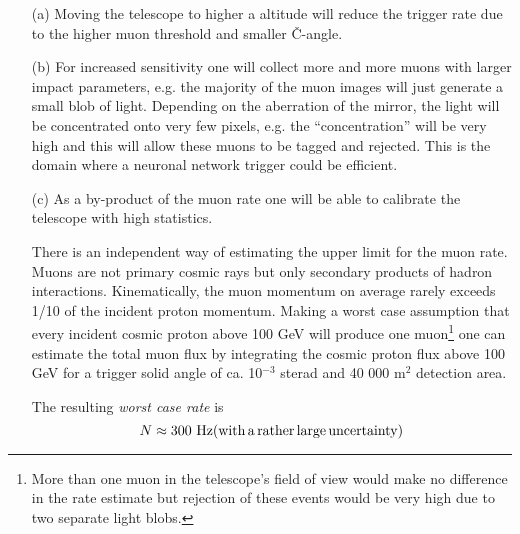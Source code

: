 \begin{itemize}
\item[(a)]  Moving the telescope to higher a altitude will
reduce the trigger rate due to the higher muon threshold and smaller \v{C}-angle.

\item[(b)]  For increased sensitivity one will collect more and more muons
with larger impact parameters, e.g. the majority of the muon images will
just generate a small blob of light. Depending on the aberration of the
mirror, the light will be concentrated onto very few pixels, e.g. the
``concentration'' will be very high and this will allow these muons to be
tagged and rejected. This is the domain where a neuronal network 
trigger could be
efficient.

\item[(c)]  As a by-product of the muon rate one will be able to
calibrate the telescope with high statistics.

There is an independent way of estimating the upper limit for 
the muon rate. Muons are
not primary cosmic rays but only secondary products of hadron interactions.
Kinematically, the muon momentum on average rarely exceeds 1/10 of the
incident proton momentum. Making a worst case assumption that every incident
cosmic proton above 100 GeV will produce one muon\footnote{%
More than one muon in the telescope's field of view would make no difference
in the rate estimate but rejection of these events would be very high due to
two separate light blobs.} one can estimate the total muon flux by
integrating the cosmic proton flux above 100 GeV for a trigger solid angle
of ca. 10$^{-3}$ sterad and 40 000 m$^{2}$ detection area.

The resulting {\it worst case rate} is 
\[
N \approx 300\ {\rm Hz} ({\rm with\, a\, rather\, large\, uncertainty})
\]


\end{itemize}
